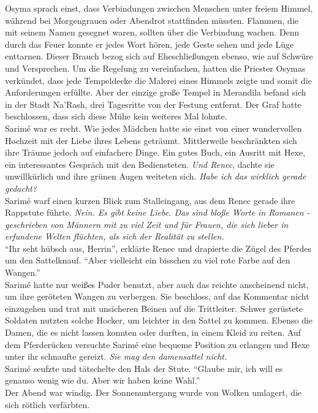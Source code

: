 Osyma sprach einst, dass Verbindungen zwischen Menschen unter freiem Himmel, während bei 
Morgengrauen oder Abendrot stattfinden müssten. Flammen, die mit seinem Namen gesegnet waren, 
sollten über die Verbindung wachen. Denn durch das Feuer konnte er jedes Wort hören, jede Geste 
sehen und jede Lüge enttarnen. Dieser Brauch bezog sich auf Eheschließungen ebenso, wie auf Schwüre 
und Versprechen. Um die Regelung zu vereinfachen, hatten die Priester Osymas verkündet, dass jede 
Tempeldecke die Malerei eines Himmels zeigte und somit die Anforderungen erfüllte. Aber der einzige 
große Tempel in Merandila befand sich in der Stadt Na'Rash, drei Tagesritte von der Festung 
entfernt. Der Graf hatte beschlossen, dass sich diese Mühe kein weiteres Mal lohnte. \\
Sarimé war es recht. Wie jedes Mädchen hatte sie einst von einer wundervollen Hochzeit mit der 
Liebe ihres Lebens geträumt. Mittlerweile beschränkten sich ihre Träume jedoch auf einfachere 
Dinge. Ein gutes Buch, ein Ausritt mit Hexe, ein interessantes Gespräch mit den Bediensteten. 
\textit{Und Renec}, dachte sie unwillkürlich und ihre grünen Augen weiteten sich. \textit{Habe ich 
das wirklich gerade gedacht?}\\
Sarimé warf einen kurzen Blick zum Stalleingang, aus dem Renec gerade ihre Rappstute führte. 
\textit{Nein. Es gibt keine Liebe. Das sind bloße Worte in Romanen - geschrieben von Männern mit zu 
viel Zeit und für Frauen, die sich lieber in erfundene Welten flüchten, als sich der Realität zu 
stellen.}\\
``Ihr seht hübsch aus, Herrin'', erklärte Renec und drapierte die Zügel des Pferdes um den 
Sattelknauf. ``Aber vielleicht ein bisschen zu viel rote Farbe auf den Wangen.''\\
Sarimé hatte nur weißes Puder benutzt, aber auch das reichte anscheinend nicht, um ihre geröteten 
Wangen zu verbergen. Sie beschloss, auf das Kommentar nicht einzugehen und trat mit unsicheren 
Beinen auf die Trittleiter. Schwer gerüstete Soldaten nutzten solche Hocker, um leichter in den 
Sattel zu kommen. Ebenso die Damen, die es nicht lassen konnten oder durften, in einem Kleid zu 
reiten. Auf dem Pferderücken versuchte Sarimé eine bequeme Position zu erlangen und Hexe unter ihr 
schnaufte gereizt. \textit{Sie mag den damensattel nicht.}\\
Sarimé seufzte und tätschelte den Hals der Stute. ``Glaube mir, ich will es genauso wenig wie du. 
Aber wir haben keine Wahl.''\\
Der Abend war windig. Der Sonnenuntergang wurde von Wolken umlagert, die sich rötlich verfärbten. 
